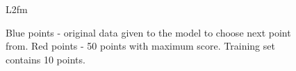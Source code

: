 \documentclass[a4paper]{article}
\begin{document}
\begin{figure}[h]
\begin{minipage}[h]{0.49\linewidth}
\end{minipage}
\hfill
\begin{minipage}[h]{0.49\linewidth}
 L2fm
\end{minipage}
\caption{Blue points - original data given to the model to choose next point from. Red points - 50 points with maximum score. Training set contains 10 points.}
\label{scoreplots}
\end{figure}
\end{document}
